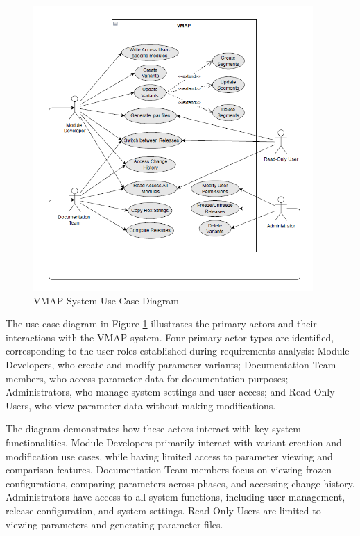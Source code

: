 \begin{figure}[h]
    \centering
    \includegraphics[width=0.95\textwidth]{figures/vmap_use_case_diagram.png}
    \caption{\ac{VMAP} System Use Case Diagram}
    \label{fig:use-case-diagram}
\end{figure}

The use case diagram in Figure \ref{fig:use-case-diagram} illustrates the primary actors and their interactions with the \ac{VMAP} system. Four primary actor types are identified, corresponding to the user roles established during requirements analysis: Module Developers, who create and modify parameter variants; Documentation Team members, who access parameter data for documentation purposes; Administrators, who manage system settings and user access; and Read-Only Users, who view parameter data without making modifications.

The diagram demonstrates how these actors interact with key system functionalities. Module Developers primarily interact with variant creation and modification use cases, while having limited access to parameter viewing and comparison features. Documentation Team members focus on viewing frozen configurations, comparing parameters across phases, and accessing change history. Administrators have access to all system functions, including user management, release configuration, and system settings. Read-Only Users are limited to viewing parameters and generating parameter files.

